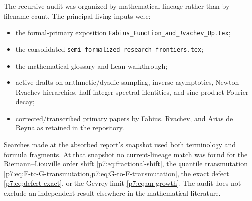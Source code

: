 \documentclass[11pt,oneside]{article}
\theoremstyle{definition}
\theoremstyle{remark}
\newcommand{\1}{\mathbf 1}
\begin{document}
The recursive audit was organized by mathematical lineage rather than by filename count.
The principal living inputs were:
\begin{itemize}
\item the formal-primary exposition \texttt{Fabius\_Function\_and\_Rvachev\_Up.tex};
\item the consolidated \texttt{semi-formalized-research-frontiers.tex};
\item the mathematical glossary and Lean walkthrough;
\item active drafts on arithmetic/dyadic sampling, inverse asymptotics, Newton--Rvachev
      hierarchies, half-integer spectral identities, and sinc-product Fourier decay;
\item corrected/transcribed primary papers by Fabius, Rvachev, and Arias de Reyna as retained
      in the repository.
\end{itemize}

Searches made at the absorbed report's snapshot used both terminology and formula fragments.
At that snapshot no current-lineage match was found for the Riemann--Liouville order shift
\cref{p7:eq:fractional-shift}, the quantile transmutation
\cref{p7:eq:F-to-G-transmutation,p7:eq:G-to-F-transmutation}, the exact defect
\cref{p7:eq:defect-exact}, or the Gevrey limit \cref{p7:eq:an-growth}.  The audit does not exclude an
independent result elsewhere in the mathematical literature.
\end{document}
